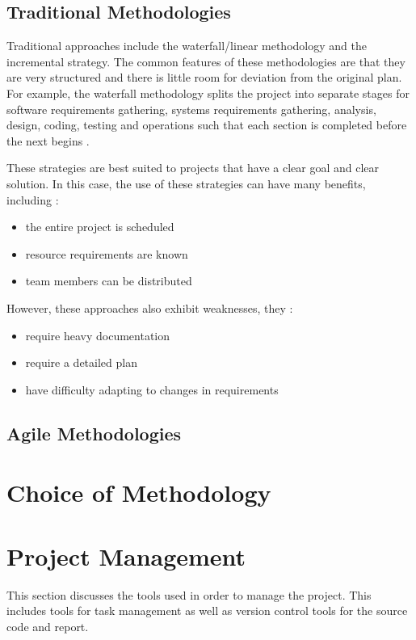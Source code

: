 \documentclass{UoYCSproject}
\begin{document}
\subsection{Traditional Methodologies} \label{trad_meth}
Traditional approaches include the waterfall/linear methodology and the incremental strategy. The common features of these methodologies are that they are very structured and there is little room for deviation from the original plan. For example, the waterfall methodology splits the project into separate stages for software requirements gathering, systems requirements gathering, analysis, design, coding, testing and operations such that each section is completed before the next begins \parencite{royce1987managing}.

These strategies are best suited to projects that have a clear goal and clear solution. In this case, the use of these strategies can have many benefits, including \parencite{fernandez2008agile}:
\begin{itemize}
\item the entire project is scheduled
\item resource requirements are known
\item team members can be distributed
\end{itemize}
However, these approaches also exhibit weaknesses, they \parencite{fernandez2008agile}:
\begin{itemize}
\item require heavy documentation
\item require a detailed plan
\item have difficulty adapting to changes in requirements
\end{itemize}

\subsection{Agile Methodologies} \label{agile_meth}
\section{Choice of Methodology}
\section{Project Management}
This section discusses the tools used in order to manage the project. This includes tools for task management as well as version control tools for the source code and report.
\end{document}
